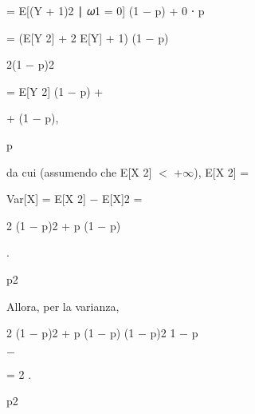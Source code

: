 \documentclass[a4paper,portrait,12pt]{article}
\begin{document}
\begin{flushleft}
= E[(Y + 1)2 ∣ 𝜔1 = 0] (1 $-$ p) + 0 ⋅ p
\end{flushleft}


\begin{flushleft}
= (E[Y 2] + 2 E[Y] + 1) (1 $-$ p)
\end{flushleft}


\begin{flushleft}
2(1 $-$ p)2
\end{flushleft}


\begin{flushleft}
= E[Y 2] (1 $-$ p) +
\end{flushleft}


\begin{flushleft}
+ (1 $-$ p),
\end{flushleft}


\begin{flushleft}
p
\end{flushleft}


\begin{flushleft}
da cui (assumendo che E[X 2] $<$ +$\infty$), E[X 2] =
\end{flushleft}


\begin{flushleft}
Var[X] = E[X 2] $-$ E[X]2 =
\end{flushleft}





\begin{flushleft}
2 (1 $-$ p)2 + p (1 $-$ p)
\end{flushleft}


.


\begin{flushleft}
p2
\end{flushleft}





\begin{flushleft}
Allora, per la varianza,
\end{flushleft}





\begin{flushleft}
2 (1 $-$ p)2 + p (1 $-$ p) (1 $-$ p)2 1 $-$ p
\end{flushleft}


$-$


= 2 .


\begin{flushleft}
p2
\end{flushleft}
\end{document}

